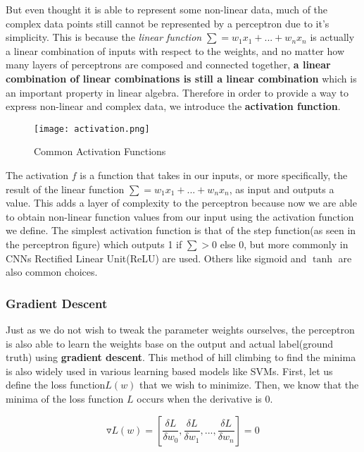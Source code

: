 \documentclass[12pt]{article}
\begin{document}
But even thought it is able to represent some non-linear data, much of the complex data points still cannot be represented by a perceptron due to it's simplicity. This is because the \textit{linear function} $\sum = w_1x_1 + ... + w_nx_n$ is actually a linear combination of inputs with respect to the weights, and no matter how many layers of perceptrons are composed and connected together, \textbf{a linear combination of linear combinations is still a linear combination} which is an important property in linear algebra. Therefore in order to provide a way to express non-linear and complex data, we introduce the \textbf{activation function}.\\

\begin{figure}[!htb]
\centering
  \texttt{[image: activation.png]}
  \caption{Common Activation Functions}
  \label{fig:af}
\end{figure}
 
The activation $f$ is a function that takes in our inputs, or more specifically, the result of the linear function $\sum = w_1x_1 + ... + w_nx_n$, as input and outputs a value. This adds a layer of complexity to the perceptron because now we are able to obtain non-linear function values from our input using the activation function we define. The simplest activation function is that of the step function(as seen in the perceptron figure) which outputs 1 if $\sum > 0$ else 0, but more commonly in CNNs Rectified Linear Unit(ReLU) are used. Others like sigmoid and $\tanh$ are also common choices.

\subsubsection{Gradient Descent}

Just as we do not wish to tweak the parameter weights ourselves, the perceptron is also able to learn the weights base on the output and actual label(ground truth) using \textbf{gradient descent}. This method of hill climbing to find the minima is also widely used in various learning based models like SVMs. First, let us define the loss function$L(w)$ that we wish to minimize. Then, we know that the minima of the loss function $L$ occurs when the derivative is 0.

\begin{equation*}
\triangledown L(w) = [\frac{\delta L}{\delta w_0}, \frac{\delta L}{\delta w_1}, ..., \frac{\delta L}{\delta w_n}] = 0
\end{equation*}
\end{document}
